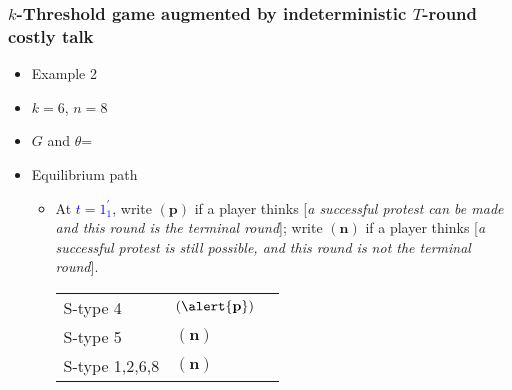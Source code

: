 \documentclass[9pt,handout]{beamer}
\begin{document}
\begin{frame}
  \frametitle{$k$-Threshold game augmented by indeterministic $T$-round costly talk}

\begin{itemize}
\item Example 2
\item $k=6$, $n=8$
\item $G$ and $\theta$=
\begin{center}
\end{center}
\end{itemize}

\begin{itemize}
\item Equilibrium path
\begin{itemize}
\item 
{
At \textcolor{blue}{$t=1^{'}_1$}, write $({\textbf{p}})$ if a player thinks \alert{[}\textit{a successful protest can be made and this round is the terminal round}\alert{]}; write $({\textbf{n}})$ if a player thinks \alert{[}\textit{a successful protest is still possible, and this round is not the terminal round}\alert{]}. 
\begin{table}[h]
\begin{tabular}{ll l}
S-type 4 & $(\alert{\textbf{p}})$\\
S-type 5 & $({\textbf{n}})$\\
S-type 1,2,6,8 & $(\textbf{n})$
\end{tabular}
\end{table}
}
\end{itemize}
\end{itemize}
\end{frame}
\end{document}
